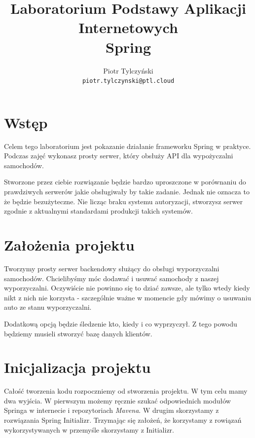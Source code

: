 \documentclass{article}
\begin{document}
    \title{Laboratorium Podstawy Aplikacji Internetowych \\
    Spring}
    \author{Piotr Tylczyński \\
    \texttt{piotr.tylczynski@ptl.cloud}}
    
    \begin{titlepage}
        \maketitle
    \end{titlepage}
    
    \tableofcontents
    \pagebreak
    
    \section{Wstęp}
    Celem tego laboratorium jest pokazanie działanie frameworku Spring w praktyce. Podczas zajęć wykonasz prosty serwer, który obsłuży API dla wypożyczalni samochodów. 
    
    Stworzone przez ciebie rozwiązanie będzie bardzo uproszczone w porównaniu do prawdziwych serwerów jakie obsługiwały by takie zadanie. Jednak nie oznacza to że będzie bezużyteczne. Nie licząc braku systemu autoryzacji, stworzysz serwer zgodnie z aktualnymi standardami produkcji takich systemów.
    
    \section{Założenia projektu}
        Tworzymy prosty serwer backendowy służący do obsługi wyporzyczalni samochodów. Chcielibyśmy móc dodawać i usuwać samochody z naszej wyporzyczalni. Oczywiście nie powinno się to dziać zawsze, ale tylko wtedy kiedy nikt z nich nie korzysta - szczególnie ważne w momencie gdy mówimy o usuwaniu auto ze stanu wyporzyczalni. 
        
        Dodatkową opcją będzie śledzenie kto, kiedy i co wyprzyczył. Z tego powodu będziemy musieli stworzyć bazę danych klientów.
    
    \section{Inicjalizacja projektu}
        Całość tworzenia kodu rozpoczniemy od stworzenia projektu. W tym celu mamy dwa wyjścia. W pierwszym możemy ręcznie szukać odpowiednich modułów Springa w internecie i repozytoriach \emph{Mavena}. W drugim skorzystamy z rozwiązania Spring Initializr. Trzymając się założeń, że korzystamy z rowiązań wykorzystywanych w przemyśle skorzystamy z Initializr. 
        
\end{document}
